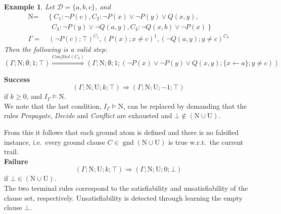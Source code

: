 \documentclass[a4paper]{article}
\newcommand{\mGnd}{\operatorname{gnd}} \newcommand{\mLVar}{\operatorname{lvar}} \newcommand{\mRVar}{\operatorname{rvar}} \newcommand{\mDmn}{\operatorname{dom}} \newcommand{\mRng}{\operatorname{rng}} \newcommand{\mMGU}{\operatorname{mgu}} \newcommand{\mDef}{\operatorname{def}} \newcommand{\mDomain}{\mathcal{D}} \newcommand{\mVar}{\operatorname{var}}
\newcommand{\leaveabit}{\\[6 pt]}
\newtheorem{example}[defi]{Example}
\newcommand\exClauseNo[1]{C_{#1}} \newcommand{\rst}[1]{|_{#1}}
\begin{document}
\begin{example}
Let $\mDomain =\{a,b,c\}$, and 
\begin{align*}
	\text{N} =&~\{~\exClauseNo{1}: \neg P(c), \exClauseNo{2}: \neg P(x) \lor \neg P(y) \lor Q(x,y), \\
								   &~~~\exClauseNo{3}: \neg P(y) \lor \neg Q(a,y), \exClauseNo{4}: \neg Q(x,b)\lor\neg P(x)~\}\\
	\Gamma =&~(\neg P(c); \top)^{\exClauseNo{1}}, (P(x); x \ne c)^1, (\neg Q(a,y); y \ne c)^{\exClauseNo{3}}
\end{align*}
Then the following is a valid step:
\[(\Gamma; \text{N}; \emptyset; 1; \top) 
\stackrel{Conflict (\exClauseNo{2})}{\Rightarrow} 
(\Gamma; \text{N}; \emptyset; 1; (\neg P(x) \lor \neg P(y) \lor Q(x,y); \{x \gets a\}; y \ne c)) 
\]
\end{example}
\textbf{Success}
\[(\Gamma; \text{N}; \text{U}; k; \top) \Rightarrow
    (\Gamma; \text{N}; \text{U}; -1; \top)\]
if $k \geq 0$, and $I_{\Gamma} \models \text{N}$.\leaveabit\indent
We note that the last condition, $I_{\Gamma} \models \text{N}$, can be replaced by 
demanding that the rules \emph{Propagate}, \emph{Decide} and \emph{Conflict} are 
exhausted and $\bot \notin (\text{N}\cup\text{U})$.

From this it follows that each ground atom is defined and there is no falsified 
instance, i.e.\ 
every ground clause $C \in \mGnd(\text{N}\cup\text{U})$ is true w.r.t.\
the current trail.\leaveabit\noindent
\textbf{Failure}
\[(\Gamma; \text{N}; \text{U}; k; \top) \Rightarrow
    (\Gamma; \text{N}; \text{U}; 0; \bot)\]
if $\bot \in (\text{N} \cup \text{U})$.\leaveabit\indent
The two terminal rules correspond to the satisfiability and unsatisfiability of the clause set, respectively. 
Unsatisfiability is detected through learning the empty clause $\bot$.
% 
\end{document}
